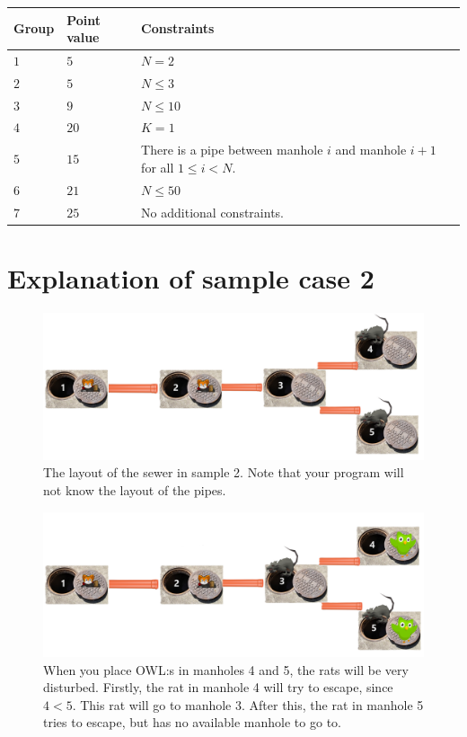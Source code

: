 \noindent
\begin{tabular}{| l | l | l |}
\hline

\textbf{Group} & \textbf{Point value} & \textbf{Constraints} \\ \hline \hline
$1$ & $5$ & $N = 2$ \\ \hline
$2$ & $5$ & $N \leq 3$ \\ \hline
$3$ & $9$ & $N \leq 10$ \\ \hline
$4$ & $20$ & $K = 1$ \\ \hline
$5$ & $15$ & There is a pipe between manhole $i$ and manhole $i+1$ for all $1 \leq i < N$. \\ \hline
$6$ & $21$ & $N \leq 50$ \\ \hline
$7$ & $25$ & No additional constraints. \\ \hline

\end{tabular}

\section*{Explanation of sample case 2}

\begin{centering}
  \begin{figure}[h]
    \centering
    \includegraphics[scale=0.2]{rats_graph before.png}
    \caption{The layout of the sewer in sample 2. Note that your program will not know the layout of the pipes.}
  \end{figure}
\end{centering}

\begin{centering}
  \begin{figure}[h]
    \centering
    \includegraphics[scale=0.2]{rats_graph step1.png}
    \caption{When you place OWL:s in manholes 4 and 5, the rats will be very disturbed. Firstly, the rat in manhole 4 will try to escape, since $4 < 5$. This rat will go to manhole 3. After this, the rat in manhole 5 tries to escape, but has no available manhole to go to.}
  \end{figure}
\end{centering}


